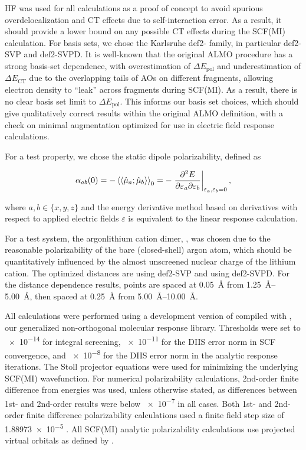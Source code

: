 HF was used for all calculations as a proof of concept to avoid spurious overdelocalization and CT effects due to self-interaction error. As a result, it should provide a lower bound on any possible CT effects during the SCF(MI) calculation. For basis sets, we chose the Karlsruhe def2- family\cite{Weigend_2005_3297,Rappoport_2010_134105}, in particular def2-SVP and def2-SVPD. It is well-known that the original ALMO procedure has a strong basis-set dependence, with overestimation of \(\Delta E_{\text{pol}}\) and underestimation of \(\Delta E_{\text{CT}}\) due to the overlapping tails of AOs on different fragments, allowing electron density to ``leak'' across fragments during SCF(MI)\cite{doi:10.1063/1.4792434}. As a result, there is no clear basis set limit to \(\Delta E_{\text{pol}}\). This informs our basis set choices, which should give qualitatively correct results within the original ALMO definition, with a check on minimal augmentation optimized for use in electric field response calculations.

For a test property, we chose the static dipole polarizability, defined as

\begin{equation}
  \alpha_{ab}(0) = -\braket{\braket{\hat{\mu}_{a}; \hat{\mu}_{b}}}_{0} = -\left.\frac{\partial^{2} E}{\partial \varepsilon_a \partial \varepsilon_b}\right|_{\varepsilon_{a},\varepsilon_{b}=0},
\end{equation}

where \(a,b \in \{x,y,z\}\) and the energy derivative method based on derivatives with respect to applied electric fields \(\varepsilon\) is equivalent to the linear response calculation.

For a test system, the argon\textemdash{}lithium cation dimer, \arlidimer{}, was chosen due to the reasonable polarizability of the bare (closed-shell) argon atom, which should be quantitatively influenced by the almost unscreened nuclear charge of the lithium cation. The optimized distances are \geomdeftsvp{} using def2-SVP and \geomdeftsvpd{} using def2-SVPD. For the distance dependence results, points are spaced at \SI{0.05}{\angstrom} from \SIrange{1.25}{5.00}{\angstrom}, then spaced at \SI{0.25}{\angstrom} from \SIrange{5.00}{10.00}{\angstrom}.

All calculations were performed using a development version of \qchem{}\cite{Shao2015} compiled with \libresponse{}, our generalized non-orthogonal molecular response library. Thresholds were set to \num{e-14} for integral screening, \num{e-11} for the DIIS error norm in SCF convergence, and \num{e-8} for the DIIS error norm in the analytic response iterations. The Stoll projector equations were used for minimizing the underlying SCF(MI) wavefunction\cite{Stoll_1980_169,Khaliullin2006}. For numerical polarizability calculations, 2nd-order finite difference from energies was used, unless otherwise stated, as differences between 1st- and 2nd-order results were below \num{e-7} \aud{} in all cases. Both 1st- and 2nd-order finite difference polarizability calculations used a finite field step size of \num{1.88973e-5} \aud{}. All SCF(MI) analytic polarizability calculations use projected virtual orbitals as defined by .

